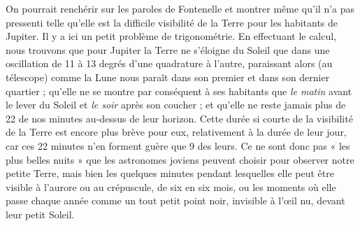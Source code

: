 \documentclass[a4paper, 11pt, oneside]{article}
\begin{document}
On pourrait renchérir sur les paroles de Fontenelle et montrer même qu'il n'a pas pressenti telle qu'elle est la difficile visibilité de la Terre pour les habitants de Jupiter. Il y a ici un petit problème de trigonométrie. En effectuant le calcul, nous trouvons que pour Jupiter la Terre ne s'éloigne du Soleil que dans une oscillation de 11 à 13 degrés d'une quadrature à l'autre, paraissant alors (au télescope) comme la Lune nous paraît dans son premier et dans son dernier quartier ; qu'elle ne se montre par conséquent à ses habitants que \emph{le matin} avant le lever du Soleil et \emph{le soir} après son coucher ; et qu'elle ne reste jamais plus de 22 de nos minutes au-dessus de leur horizon. Cette durée si courte de la visibilité de la Terre est encore plus brève pour eux, relativement à la durée de leur jour, car ces 22 minutes n'en forment guère que 9 des leurs. Ce ne sont donc pas « les plus belles nuits » que les astronomes joviens peuvent choisir pour observer notre petite Terre, mais bien les quelques minutes pendant lesquelles elle peut être visible à l'aurore ou au crépuscule, de six en six mois, ou les moments où elle passe chaque année comme un tout petit point noir, invisible à l'œil nu, devant leur petit Soleil.
\end{document}
